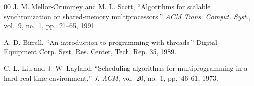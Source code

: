 \documentclass[conference]{IEEEtran}
\begin{document}
\begin{thebibliography}{00}
 J. M. Mellor-Crummey and M. L. Scott, ``Algorithms for scalable synchronization on shared-memory multiprocessors,'' \textit{ACM Trans. Comput. Syst.}, vol.~9, no.~1, pp.~21--65, 1991.

 A. D. Birrell, ``An introduction to programming with threads,'' Digital Equipment Corp. Syst. Res. Center, Tech. Rep. 35, 1989.

 C. L. Liu and J. W. Layland, ``Scheduling algorithms for multiprogramming in a hard-real-time environment,'' \textit{J. ACM}, vol.~20, no.~1, pp.~46--61, 1973.

\end{thebibliography}
\end{document}
